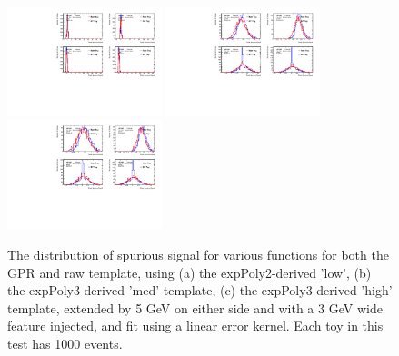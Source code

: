 \begin{figure} 
\begin{center}
  \includegraphics[width=0.4\textwidth]{figures/background/gpr/validation/linear/ToyTest_FitSigVals_lowpT_1000_Sig}   
  \includegraphics[width=0.4\textwidth]{figures/background/gpr/validation/linear/ToyTest_FitSigVals_medpT_1000_Sig}   
  \includegraphics[width=0.4\textwidth]{figures/background/gpr/validation/linear/ToyTest_FitSigVals_highpT_1000_Sig}   
\caption{The distribution of spurious signal for various functions for both the GPR and raw template, using (a) the expPoly2-derived 'low', (b) the expPoly3-derived 'med' template, (c) the expPoly3-derived 'high' template, extended by 5 GeV on either side and with a 3 GeV wide feature injected, and fit using a linear error kernel. Each toy in this test has 1000 events.}
\label{fig:linearkernel_lowpt_1000_Sig}
\end{center}
\end{figure}

